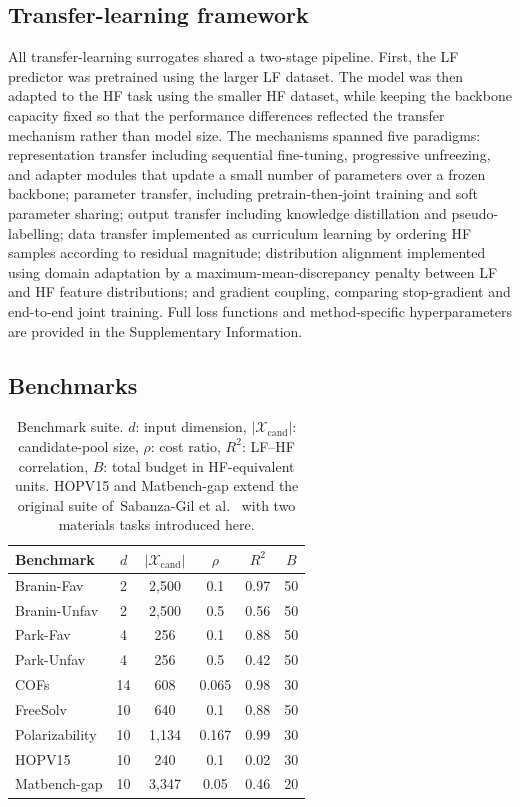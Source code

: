 \documentclass[11pt,a4paper]{article}%
\begin{document}
\subsection{Transfer-learning framework}\label{sec:meth-transfer}

All transfer-learning surrogates shared a two-stage pipeline. First, the LF
predictor was pretrained using the larger LF dataset. The model was then adapted to the
HF task using the smaller HF dataset, while keeping the backbone capacity 
fixed so that the performance differences reflected the transfer mechanism rather than model size. The mechanisms spanned five paradigms:
representation transfer including sequential fine-tuning, progressive unfreezing, and adapter
modules that update a small number of parameters over a frozen backbone; parameter transfer, including pretrain-then-joint training and soft parameter sharing; output transfer including knowledge
distillation and pseudo-labelling; data transfer implemented as curriculum learning by ordering
HF samples according to residual magnitude; distribution alignment implemented using domain adaptation by
a maximum-mean-discrepancy penalty between LF and HF feature distributions; and gradient
coupling, comparing stop-gradient and end-to-end joint training. Full loss functions and method-specific
hyperparameters are provided in the Supplementary Information.

\subsection{Benchmarks}\label{sec:meth-benchmarks}

\begin{table}[h]
\centering
\caption{Benchmark suite. $d$: input dimension, $|\mathcal{X}_{\mathrm{cand}}|$:
candidate-pool size, $\rho$: cost ratio, $R^2$: LF--HF correlation, $B$: total budget in
HF-equivalent units. HOPV15 and Matbench-gap extend the original suite of~Sabanza-Gil et
al.~\citep{sabanza2025best} with two materials tasks introduced here.}
\label{tab:benchmarks}
\begin{tabular}{lccccc}
\toprule
\textbf{Benchmark} & $d$ & $|\mathcal{X}_{\mathrm{cand}}|$ & $\rho$ & $R^2$ & $B$ \\
\midrule
Branin-Fav & 2 & 2{,}500 & 0.1 & 0.97 & 50 \\
Branin-Unfav & 2 & 2{,}500 & 0.5 & 0.56 & 50 \\
Park-Fav & 4 & 256 & 0.1 & 0.88 & 50 \\
Park-Unfav & 4 & 256 & 0.5 & 0.42 & 50 \\
COFs & 14 & 608 & 0.065 & 0.98 & 30 \\
FreeSolv & 10 & 640 & 0.1 & 0.88 & 50 \\
Polarizability & 10 & 1{,}134 & 0.167 & 0.99 & 30 \\
HOPV15 & 10 & 240 & 0.1 & 0.02 & 30 \\
Matbench-gap & 10 & 3{,}347 & 0.05 & 0.46 & 20 \\
\bottomrule
\end{tabular}
\end{table}
\end{document}
